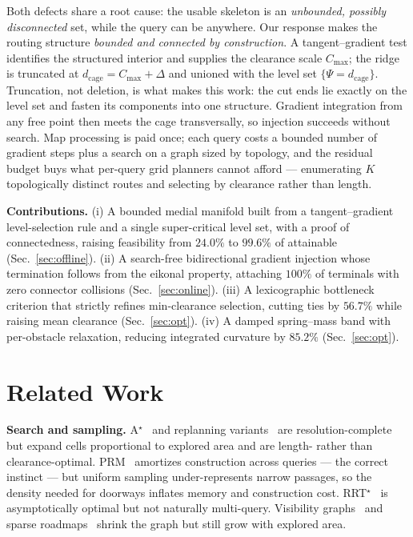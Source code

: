 \documentclass[conference]{IEEEtran}
\begin{document}
Both defects share a root cause: the usable skeleton is an \emph{unbounded, possibly disconnected} set, while the query can be anywhere. Our response makes the routing structure \emph{bounded and connected by construction}. A tangent--gradient test identifies the structured interior and supplies the clearance scale $C_{\max}$; the ridge is truncated at $d_{\mathrm{cage}}=C_{\max}+\Delta$ and unioned with the level set $\{\Psi=d_{\mathrm{cage}}\}$. Truncation, not deletion, is what makes this work: the cut ends lie exactly on the level set and fasten its components into one structure. Gradient integration from any free point then meets the cage transversally, so injection succeeds without search. Map processing is paid once; each query costs a bounded number of gradient steps plus a search on a graph sized by topology, and the residual budget buys what per-query grid planners cannot afford --- enumerating $K$ topologically distinct routes and selecting by clearance rather than length.

\textbf{Contributions.} (i) A bounded medial manifold built from a tangent--gradient level-selection rule and a single super-critical level set, with a proof of connectedness, raising feasibility from $24.0\%$ to $99.6\%$ of attainable (Sec.~\ref{sec:offline}). (ii) A search-free bidirectional gradient injection whose termination follows from the eikonal property, attaching $100\%$ of terminals with zero connector collisions (Sec.~\ref{sec:online}). (iii) A lexicographic bottleneck criterion that strictly refines min-clearance selection, cutting ties by $56.7\%$ while raising mean clearance (Sec.~\ref{sec:opt}). (iv) A damped spring--mass band with per-obstacle relaxation, reducing integrated curvature by $85.2\%$ (Sec.~\ref{sec:opt}).

\section{Related Work}

\textbf{Search and sampling.} A$^\star$~\cite{hart1968} and replanning variants~\cite{koenig2005} are resolution-complete but expand cells proportional to explored area and are length- rather than clearance-optimal. PRM~\cite{kavraki1996} amortizes construction across queries --- the correct instinct --- but uniform sampling under-represents narrow passages, so the density needed for doorways inflates memory and construction cost. RRT$^\star$~\cite{karaman2011,lavalle1998} is asymptotically optimal but not naturally multi-query. Visibility graphs~\cite{yang2022far} and sparse roadmaps~\cite{dobson2014} shrink the graph but still grow with explored area.
\end{document}
